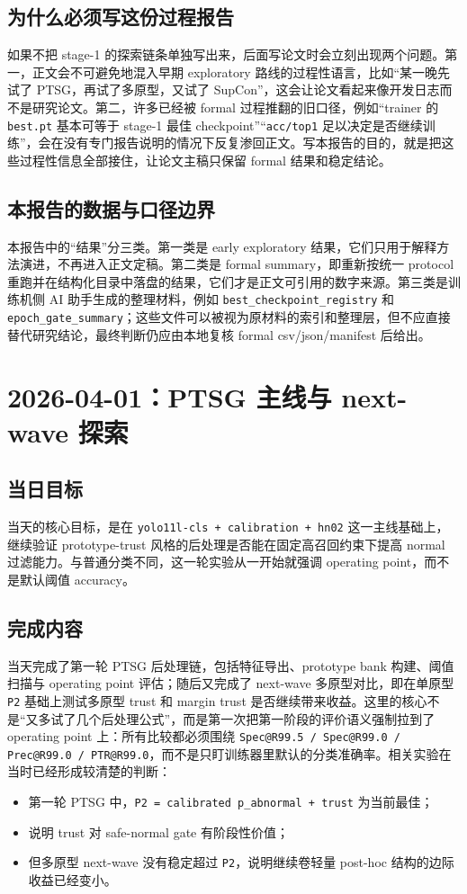 \documentclass[UTF8,12pt]{ctexart}
\newcommand{\reportdate}[1]{\section{#1}}
\begin{document}
\subsection{为什么必须写这份过程报告}
如果不把 stage-1 的探索链条单独写出来，后面写论文时会立刻出现两个问题。第一，正文会不可避免地混入早期 exploratory 路线的过程性语言，比如“某一晚先试了 PTSG，再试了多原型，又试了 SupCon”，这会让论文看起来像开发日志而不是研究论文。第二，许多已经被 formal 过程推翻的旧口径，例如“trainer 的 \texttt{best.pt} 基本可等于 stage-1 最佳 checkpoint”“\texttt{acc/top1} 足以决定是否继续训练”，会在没有专门报告说明的情况下反复渗回正文。写本报告的目的，就是把这些过程性信息全部接住，让论文主稿只保留 formal 结果和稳定结论。

\subsection{本报告的数据与口径边界}
本报告中的“结果”分三类。第一类是 early exploratory 结果，它们只用于解释方法演进，不再进入正文定稿。第二类是 formal summary，即重新按统一 protocol 重跑并在结构化目录中落盘的结果，它们才是正文可引用的数字来源。第三类是训练机侧 AI 助手生成的整理材料，例如 \texttt{best\_checkpoint\_registry} 和 \texttt{epoch\_gate\_summary}；这些文件可以被视为原材料的索引和整理层，但不应直接替代研究结论，最终判断仍应由本地复核 formal csv/json/manifest 后给出。

\reportdate{2026-04-01：PTSG 主线与 next-wave 探索}

\subsection{当日目标}
当天的核心目标，是在 \texttt{yolo11l-cls + calibration + hn02} 这一主线基础上，继续验证 prototype-trust 风格的后处理是否能在固定高召回约束下提高 normal 过滤能力。与普通分类不同，这一轮实验从一开始就强调 operating point，而不是默认阈值 accuracy。

\subsection{完成内容}
当天完成了第一轮 PTSG 后处理链，包括特征导出、prototype bank 构建、阈值扫描与 operating point 评估；随后又完成了 next-wave 多原型对比，即在单原型 \texttt{P2} 基础上测试多原型 trust 和 margin trust 是否继续带来收益。这里的核心不是“又多试了几个后处理公式”，而是第一次把第一阶段的评价语义强制拉到了 operating point 上：所有比较都必须围绕 \texttt{Spec@R99.5 / Spec@R99.0 / Prec@R99.0 / PTR@R99.0}，而不是只盯训练器里默认的分类准确率。相关实验在当时已经形成较清楚的判断：
\begin{itemize}
    \item 第一轮 PTSG 中，\texttt{P2 = calibrated p\_abnormal + trust} 为当前最佳；
    \item 说明 trust 对 safe-normal gate 有阶段性价值；
    \item 但多原型 next-wave 没有稳定超过 \texttt{P2}，说明继续卷轻量 post-hoc 结构的边际收益已经变小。
\end{itemize}
\end{document}
